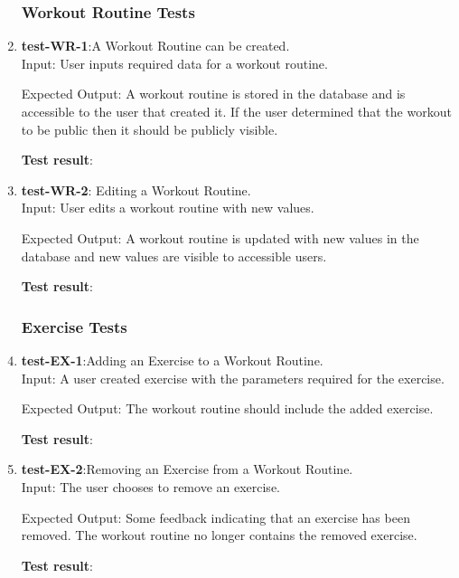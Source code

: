 \documentclass[12pt, titlepage]{article}
\begin{document}
\begin{enumerate}
	
\subsubsection{Workout Routine Tests}
	\item{\textbf{test-WR-1}}:A Workout Routine can be created.\\
	
	Input: User inputs required data for a workout routine.
	
	Expected Output: A workout routine is stored in the database and is accessible to the user that created it. If the user determined that the workout to be public then it should be publicly visible.
	
	\textbf{Test result}:
	
	\item{\textbf{test-WR-2}}: Editing a Workout Routine.\\
	
	Input: User edits a workout routine with new values.
	
	Expected Output: A workout routine is updated with new values in the database and new values are visible to accessible users.
	
	\textbf{Test result}:
	
\subsubsection{Exercise Tests}
	\item{\textbf{test-EX-1}}:Adding an Exercise to a Workout Routine.\\
	
	Input: A user created exercise with the parameters required for the exercise.
	
	Expected Output: The workout routine should include the added exercise.
	
	\textbf{Test result}:
	
	\item{\textbf{test-EX-2}}:Removing an Exercise from a Workout Routine.\\
	
	Input: The user chooses to remove an exercise.
	
	Expected Output: Some feedback indicating that an exercise has been removed. The workout routine no longer contains the removed exercise.
	
	\textbf{Test result}:
	

\end{enumerate}
\end{document}
